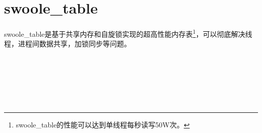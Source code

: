 \section{swoole\_table}


swoole\_table是基于共享内存和自旋锁实现的超高性能内存表\footnote{swoole\_table的性能可以达到单线程每秒读写50W次。}，可以彻底解决线程，进程间数据共享，加锁同步等问题。




\begin{lstlisting}[language=bash]

\end{lstlisting}





\begin{lstlisting}[language=bash]

\end{lstlisting}





\begin{lstlisting}[language=bash]

\end{lstlisting}




\begin{lstlisting}[language=bash]

\end{lstlisting}




\begin{lstlisting}[language=bash]

\end{lstlisting}




\begin{lstlisting}[language=bash]

\end{lstlisting}




\begin{lstlisting}[language=bash]

\end{lstlisting}




\begin{lstlisting}[language=bash]

\end{lstlisting}




